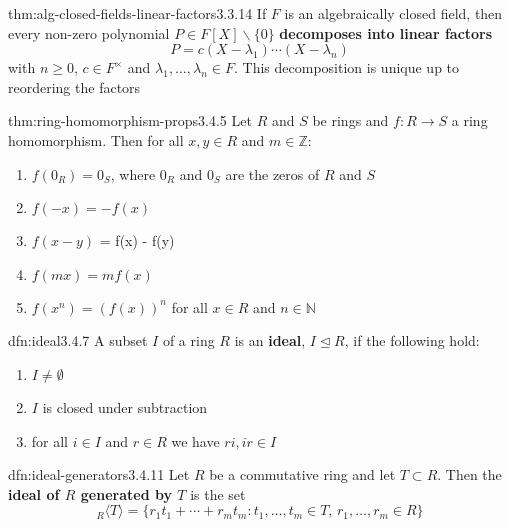 \documentclass[landscape, 8pt]{extarticle}
\begin{document}
\begin{multicols}{3}
\begin{thm}{thm:alg-closed-fields-linear-factors}{3.3.14}
    If $F$ is an algebraically closed field, then every non-zero polynomial $P\in F[X]\backslash \{0\}$ \textbf{decomposes into linear factors}
    \[P = c(X - \lambda_{1}) \cdots (X - \lambda_{n})\]
    with $n\ge 0,\, c\in F^{\times}$ and $\lambda_{1},\dots,\lambda_{n}\in F$. This decomposition is unique up to reordering the factors
\end{thm}


\begin{thm}{thm:ring-homomorphism-props}{3.4.5}
    Let $R$ and $S$ be rings and $f : R \to S$ a ring homomorphism. Then for all $x,y\in R$ and $m\in \mathbb{Z}$:
    \begin{enumerate}
        \setlength\itemsep{0em}
        \item $f(0_{R}) = 0_{S}$, where $0_{R}$ and $0_{S}$ are the zeros of $R$ and $S$
        \item $f(-x) = -f(x)$
        \item $f(x - y)$ = f(x) - f(y)
        \item $f(mx) = mf(x)$
        \item $f(x^{n}) = (f(x))^{n}$ for all $x\in R$ and $n\in \mathbb{N}$
    \end{enumerate}
\end{thm}

\begin{dfn}[Ideal]{dfn:ideal}{3.4.7}
    A subset $I$ of a ring $R$ is an \textbf{ideal}, $I \unlhd R$, if the following hold:
    \begin{enumerate}
        \setlength\itemsep{0em}
        \item $I \ne \emptyset$
        \item $I$ is closed under subtraction
        \item for all $i\in I$ and $r\in R$ we have $ri, ir\in I$
    \end{enumerate}
\end{dfn}

\begin{dfn}{dfn:ideal-generators}{3.4.11}
    Let $R$ be a commutative ring and let $T \subset R$. Then the \textbf{ideal of $R$ generated by $T$} is the set
    \[{}_{R}\langle T \rangle = \{r_{1}t_{1}+\cdots+r_{m}t_{m} : t_{1},\dots,t_{m}\in T,\,r_{1},\dots,r_{m}\in R\}\]
\end{dfn}


\end{multicols}
\end{document}
